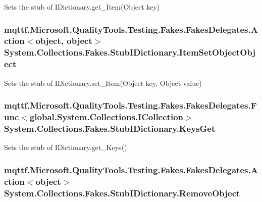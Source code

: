 Sets the stub of I\-Dictionary.\-get\-\_\-\-Item(\-Object key)

\hypertarget{class_system_1_1_collections_1_1_fakes_1_1_stub_i_dictionary_a50b5765802ede4af59d4525035c84ba1}{
\subsubsection[{Item\-Set\-Object\-Object}]{\setlength{\rightskip}{0pt plus 5cm}mqttf.\-Microsoft.\-Quality\-Tools.\-Testing.\-Fakes.\-Fakes\-Delegates.\-Action$<$object, object$>$ System.\-Collections.\-Fakes.\-Stub\-I\-Dictionary.\-Item\-Set\-Object\-Object}}\label{class_system_1_1_collections_1_1_fakes_1_1_stub_i_dictionary_a50b5765802ede4af59d4525035c84ba1}


Sets the stub of I\-Dictionary.\-set\-\_\-\-Item(\-Object key, Object value)

\hypertarget{class_system_1_1_collections_1_1_fakes_1_1_stub_i_dictionary_a95e29d890299fa624b8ef35ac809bd18}{
\subsubsection[{Keys\-Get}]{\setlength{\rightskip}{0pt plus 5cm}mqttf.\-Microsoft.\-Quality\-Tools.\-Testing.\-Fakes.\-Fakes\-Delegates.\-Func$<$global.\-System.\-Collections.\-I\-Collection$>$ System.\-Collections.\-Fakes.\-Stub\-I\-Dictionary.\-Keys\-Get}}\label{class_system_1_1_collections_1_1_fakes_1_1_stub_i_dictionary_a95e29d890299fa624b8ef35ac809bd18}


Sets the stub of I\-Dictionary.\-get\-\_\-\-Keys()

\hypertarget{class_system_1_1_collections_1_1_fakes_1_1_stub_i_dictionary_af1641d3ce06cd535a5fbe77ec86d8518}{
\subsubsection[{Remove\-Object}]{\setlength{\rightskip}{0pt plus 5cm}mqttf.\-Microsoft.\-Quality\-Tools.\-Testing.\-Fakes.\-Fakes\-Delegates.\-Action$<$object$>$ System.\-Collections.\-Fakes.\-Stub\-I\-Dictionary.\-Remove\-Object}}\label{class_system_1_1_collections_1_1_fakes_1_1_stub_i_dictionary_af1641d3ce06cd535a5fbe77ec86d8518}


